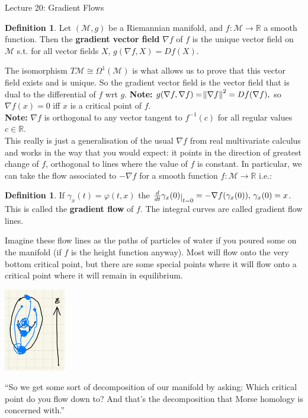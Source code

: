 \documentclass[10pt]{article}
\theoremstyle{plain}
\theoremstyle{definition}
\newtheorem{defn}[thm]{Definition} %
\newcommand{\Note}{\textbf{Note: }}
\newcommand{\Real}{\mathbb{R}}
\newcommand{\man}{\mathcal{M}}
\newcommand{\tangbundle}{T\man}
\newcommand{\deriv}{d}
\newcommand{\dt}{\deriv t}
\def\restrict#1{\raise-.5ex\hbox{\ensuremath|}_{#1}}
\begin{document}
\begin{section}{Lecture 20: Gradient Flows}
\begin{defn}
    Let $(\man,g)$ be a Riemannian manifold, and $f:\man\to\Real$ a smooth function. Then the \textbf{gradient vector field} $\nabla f$ of $f$ is the unique vector field on $\man$ s.t. for all vector fields $X$, $g(\nabla f, X) = Df(X)$.
\end{defn}
The isomorphism $\tangbundle \cong \Omega^1(\man)$ is what allows us to prove that this vector field exists and is unique. So the gradient vector field is the vector field that is dual to the differential of $f$ wrt $g$.
\Note $g(\nabla f,\nabla f) = \norm{\nabla f}^2 = Df(\nabla f),$ so $\nabla f(x) = 0 $ iff $x$ is a critical point of $f$.\\
\Note $\nabla f$ is orthogonal to any vector tangent to $f^{-1}(c)$ for all regular values $c\in\Real.$\\
This really is just a generalisation of the usual $\nabla f$ from real multivariate calculus and works in the way that you would expect: it points in the direction of greatest change of $f$, orthogonal to lines where the value of $f$ is constant. In particular, we can take the flow associated to $-\nabla f$ for a smooth function $f:\man \to \Real $ i.e.: 
\begin{defn}
    If $\gamma_x(t) = \varphi(t,x)$ the $\frac{\deriv}{\dt} \gamma_x(0)\restrict{t=0} = -\nabla f(\gamma_x(0)), \, \gamma_x(0) = x$. This is called the \textbf{gradient flow} of $f$. The integral curves are called gradient flow lines.
\end{defn}
Imagine these flow lines as the paths of particles of water if you poured some on the manifold (if $f$ is the height function anyway). Most will flow onto the very bottom critical point, but there are some special points where it will flow onto a critical point where it will remain in equilibrium.
\begin{center}
    \includegraphics[width = 0.20\textwidth]{WaterGradientFlowLines.png}
\end{center}
``So we get some sort of decomposition of our manifold by asking: Which critical point do you flow down to? And that's the decomposition that Morse homology is concerned with.''


\end{section}
\end{document}
